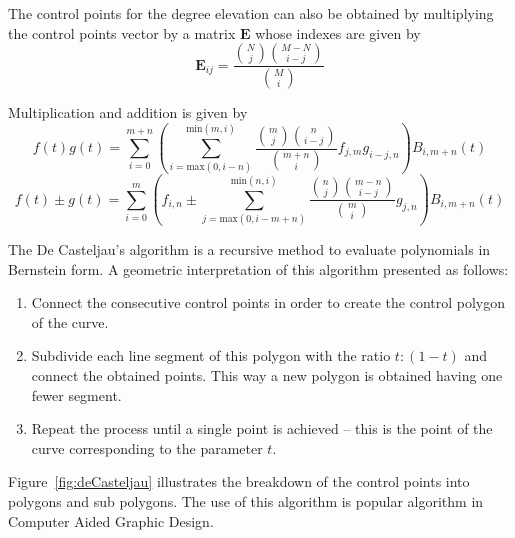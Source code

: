 \par The control points for the degree elevation can also be obtained by multiplying the control points vector by a matrix $\boldsymbol{E}$ whose indexes are given by 
\begin{equation}
    \label{eq:bernsteinelevindexes}
    \boldsymbol{E}_{ij} = \frac{{N\choose j}{M-N\choose i-j}}{{M\choose i}}
\end{equation}


\par Multiplication and addition is given by
\begin{equation}
    \label{eq:bern_mul}
    f(t)g(t) = \sum^{m+n}_{i=0}  \left(\sum_{i=\text{max}(0,i-n)}^{\text{min}(m,i)} \frac{\binom{m}{j}\binom{n}{i-j}}{\binom{m+n}{i}} f_{j,m}g_{i-j,n}\right) B_{i,m+n}(t)
\end{equation}
\begin{equation}
    \label{eq:bern_sum}
    f(t)\pm g(t) = 
    \sum^{m}_{i=0}  \left(f_{i,n} \pm \sum_{j=\text{max}(0,i-m+n)}^{\text{min}(n,i)} \frac{\binom{n}{j}\binom{m-n}{i-j}}{\binom{m}{i}} g_{j,n}\right) B_{i,m+n}(t)
\end{equation}

\par The De Casteljau's algorithm is a recursive method to evaluate polynomials in Bernstein form. A geometric interpretation of this algorithm presented as follows: 
\begin{enumerate}
    \item Connect the consecutive control points in order to create the control polygon of the curve.
	\item Subdivide each line segment of this polygon with the ratio $t:(1-t)$ and connect the obtained points. This way a new polygon is obtained having one fewer segment.
    \item Repeat the process until a single point is achieved – this is the point of the curve corresponding to the parameter $t$.
\end{enumerate}
    
Figure~\ref{fig:deCasteljau} illustrates the breakdown of the control points into polygons and sub polygons. The use of this algorithm is popular algorithm in Computer Aided Graphic Design.

